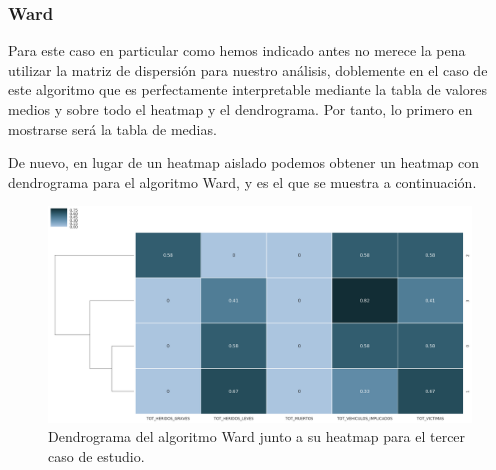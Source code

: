 	\subsubsection{Ward}
	
	Para este caso en particular como hemos indicado antes no merece la pena utilizar la matriz de dispersión para nuestro análisis, doblemente en el caso de este algoritmo que es perfectamente interpretable mediante la tabla de valores medios y sobre todo el heatmap y el dendrograma. Por tanto, lo primero en mostrarse será la tabla de medias.
	
	\begin{table}[H]
		\centering
		\caption{Tabla de valores medios del algoritmo Ward para el tercer caso de estudio.}
	\end{table}
	
	De nuevo, en lugar de un heatmap aislado podemos obtener un heatmap con dendrograma para el algoritmo Ward, y es el que se muestra a continuación.
	
	\begin{figure}[H]
		\centering
		\includegraphics[scale=0.4]{dendrograms/Ward-WetOverturnedAccidents-Dendrogram.png}
		\caption{Dendrograma del algoritmo Ward junto a su heatmap para el tercer caso de estudio.}
	\end{figure}

